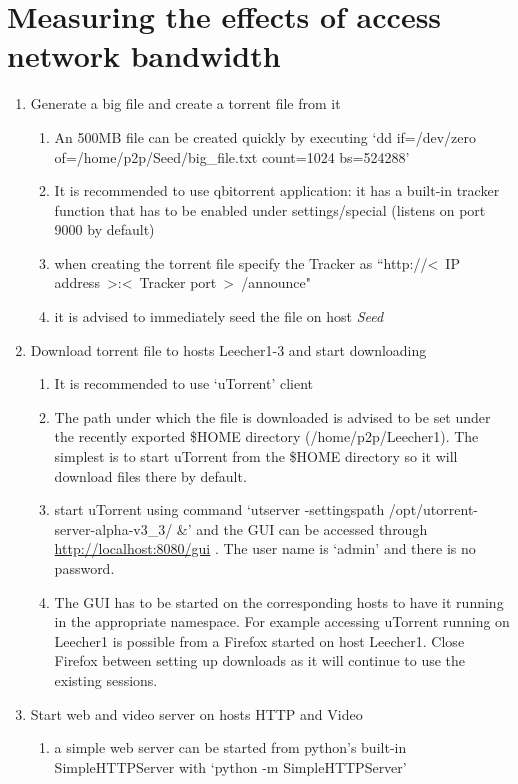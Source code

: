 \documentclass[a4paper]{article}
\begin{document}
\section{Measuring the effects of access network bandwidth}
\begin{enumerate}
	\item Generate a big file and create a torrent file from it
	\begin{enumerate}
		\item An 500MB file can be created quickly by executing `dd if=/dev/zero of=/home/p2p/Seed/big\_file.txt count=1024 bs=524288'
		\item It is recommended to use qbitorrent application: it has a built-in tracker function that has to be enabled under settings/special (listens on port 9000 by default)
		\item when creating the torrent file specify the Tracker as ``http://\textless~IP address~\textgreater:\textless~Tracker port~\textgreater~/announce"
		\item it is advised to immediately seed the file on host \emph{Seed}
	\end{enumerate}
	\item  Download torrent file to hosts Leecher1-3 and start downloading
	\begin{enumerate}
		\item It is recommended to use `uTorrent' client
		\item The path under which the file is downloaded is advised to be set under the recently exported \$HOME directory (/home/p2p/Leecher1). The simplest is to start uTorrent from the \$HOME directory so it will download files there by default.
		\item start uTorrent using command `utserver -settingspath /opt/utorrent-server-alpha-v3\_3/ \&' and the GUI can be accessed through \url{http://localhost:8080/gui} . The user name is `admin' and there is no password.
		\item The GUI has to be started on the corresponding hosts to have it running in the appropriate namespace. For example accessing uTorrent running on Leecher1 is possible from a Firefox started on host Leecher1. Close Firefox between setting up downloads as it will continue to use the existing sessions.
	\end{enumerate}
	\item Start web and video server on hosts HTTP and Video
	\begin{enumerate}
		\item a simple web server can be started from python's built-in SimpleHTTPServer  with `python -m SimpleHTTPServer'

\end{enumerate}
\end{enumerate}
\end{document}

